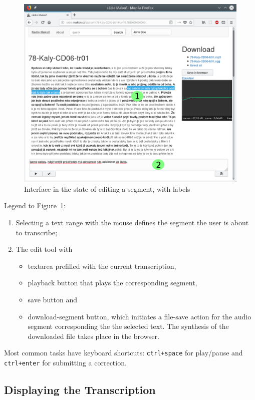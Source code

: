 \documentclass{svproc}
\begin{document}
\begin{figure}[htpb]
\includegraphics[scale=0.6]{rc/radio-makon-en-2-lab.png}
\caption{Interface in the state of editing a segment, with labels}
\label{fig:scn2lab}
\end{figure}

Legend to Figure~\ref{fig:scn2lab}:
\begin{enumerate}
\item{
    Selecting a text range with the mouse defines the segment the user is about
    to transcribe;
}
\item{
    The edit tool with
    \begin{itemize}
    \item{textarea prefilled with the current transcription,}
    \item{playback button that plays the corresponding segment,}
    \item{save button and}
    \item{download-segment button, which initiates a file-save action for the
    audio segment corresponding the the selected text. The synthesis of the
    downloaded file takes place in the browser.}
    \end{itemize}
}
\end{enumerate}

Most common tasks have keyboard shortcuts: \texttt{ctrl+space} for play/pause
and \texttt{ctrl+enter} for submitting a correction.

\subsection{Displaying the Transcription}
\end{document}
